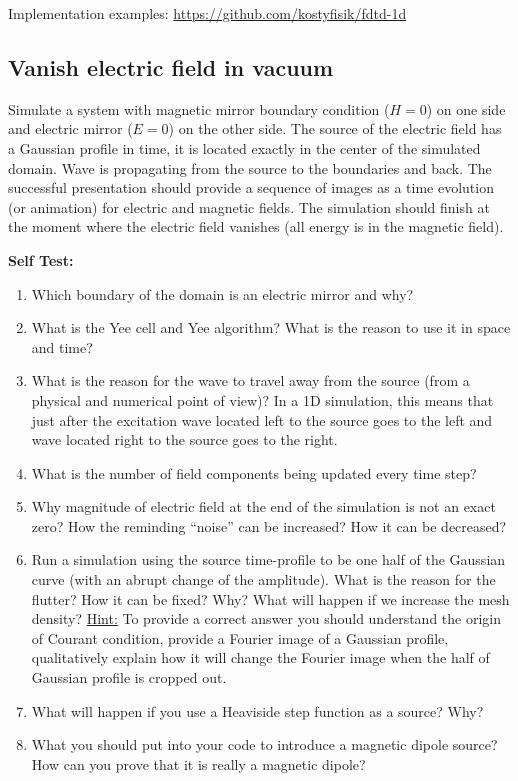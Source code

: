\documentclass[11pt]{article}
\begin{document}
  Implementation examples: \url{https://github.com/kostyfisik/fdtd-1d}


\subsection{Vanish electric field in vacuum\label{sec:vanish-e-field}}
Simulate a system with magnetic mirror boundary condition ($H=0$) on
one side and electric mirror ($E= 0$) on the other side. The source of
the electric field has a Gaussian profile in time, it is located exactly
in the center of the simulated domain. Wave is propagating from the
source to the boundaries and back. The successful presentation should
provide a sequence of images as a time evolution (or animation) for
electric and magnetic fields. The simulation should finish at the
moment where the electric field vanishes (all energy is in the
magnetic field).

\textbf{Self Test:}
\begin{enumerate}
\item  Which boundary of the domain is an electric mirror and why?
\item What is the Yee cell and Yee algorithm? What is the reason to use it in space and time?
\item What is the reason for the wave to travel away from the source
  (from a physical and numerical point of view)? In a 1D simulation, this
  means that just after the excitation wave located left to the source goes to
  the left and wave located right to the source goes to the
  right.
\item What is the number of field components being updated every time step?
\item Why magnitude of electric field at the end of
  the simulation is not an exact zero? How the reminding ``noise''
  can be increased? How it can be decreased?
\item Run a simulation using the source time-profile to be one half of
  the Gaussian curve (with an abrupt change of the amplitude). What is the reason for the flutter? How it can
  be fixed? Why? What will happen if we increase the mesh density? \underline{Hint:} To provide a correct answer you should
  understand the origin of Courant condition, provide a Fourier image
  of a Gaussian profile, qualitatively explain how it will change the
  Fourier image when the half of Gaussian profile is cropped out.
\item  What will happen if you use a Heaviside step function as a source? Why?
\item  What you should put into your code to introduce a
  magnetic dipole source? How can you prove that it is really a
  magnetic dipole?
\end{enumerate}
\end{document}
